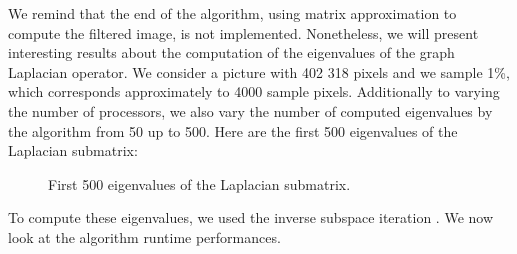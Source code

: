 We remind that the end of the algorithm, using matrix approximation to compute the filtered image, is not implemented.
Nonetheless, we will present interesting results about the computation of the eigenvalues of the graph Laplacian operator.
We consider a picture with 402 318 pixels and we sample 1\%, which corresponds approximately to 4000 sample pixels.
Additionally to varying the number of processors, we also vary the number of computed eigenvalues by the algorithm from 50 up to 500.
Here are the first 500 eigenvalues of the Laplacian submatrix:

\begin{figure}[H]
  \centering
  
  \caption{First 500 eigenvalues of the Laplacian submatrix.}
\end{figure}

To compute these eigenvalues, we used the inverse subspace iteration \cite{el_khoury_acceleration_2014}.
We now look at the algorithm runtime performances.
